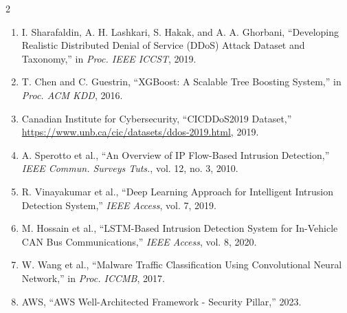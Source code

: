 \documentclass[10pt,a4paper]{article}
\begin{document}
\begin{multicols}{2}
\begin{enumerate}
\small
\item I. Sharafaldin, A. H. Lashkari, S. Hakak, and A. A. Ghorbani, ``Developing Realistic Distributed Denial of Service (DDoS) Attack Dataset and Taxonomy,'' in \textit{Proc. IEEE ICCST}, 2019.
\item T. Chen and C. Guestrin, ``XGBoost: A Scalable Tree Boosting System,'' in \textit{Proc. ACM KDD}, 2016.
\item Canadian Institute for Cybersecurity, ``CICDDoS2019 Dataset,'' \url{https://www.unb.ca/cic/datasets/ddos-2019.html}, 2019.
\item A. Sperotto et al., ``An Overview of IP Flow-Based Intrusion Detection,'' \textit{IEEE Commun. Surveys Tuts.}, vol. 12, no. 3, 2010.
\item R. Vinayakumar et al., ``Deep Learning Approach for Intelligent Intrusion Detection System,'' \textit{IEEE Access}, vol. 7, 2019.
\item M. Hossain et al., ``LSTM-Based Intrusion Detection System for In-Vehicle CAN Bus Communications,'' \textit{IEEE Access}, vol. 8, 2020.
\item W. Wang et al., ``Malware Traffic Classification Using Convolutional Neural Network,'' in \textit{Proc. ICCMB}, 2017.
\item AWS, ``AWS Well-Architected Framework - Security Pillar,'' 2023.
\end{enumerate}

\end{multicols}
\end{document}
